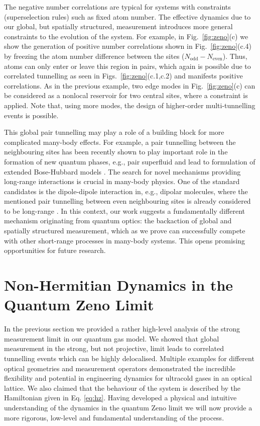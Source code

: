 The negative number correlations are typical for systems with
constraints (superselection rules) such as fixed atom number. The
effective dynamics due to our global, but spatially structured,
measurement introduces more general constraints to the evolution of
the system. For example, in Fig.~\ref{fig:zeno}(c) we show the
generation of positive number correlations shown in
Fig.~\ref{fig:zeno}(c.4) by freezing the atom number difference
between the sites ($N_\text{odd}-N_\text{even}$). Thus, atoms can only
enter or leave this region in pairs, which again is possible due to
correlated tunnelling as seen in Figs.~\ref{fig:zeno}(c.1,c.2) and
manifests positive correlations. As in the previous example, two edge
modes in Fig.~\ref{fig:zeno}(c) can be considered as a nonlocal
reservoir for two central sites, where a constraint is applied. Note
that, using more modes, the design of higher-order multi-tunnelling
events is possible.

This global pair tunnelling may play a role of a building block for
more complicated many-body effects. For example, a pair tunnelling
between the neighbouring sites has been recently shown to play
important role in the formation of new quantum phases, e.g., pair
superfluid \cite{sowinski2012} and lead to formulation of extended
Bose-Hubbard models \cite{omjyoti2015}. The search for novel
mechanisms providing long-range interactions is crucial in many-body
physics. One of the standard candidates is the dipole-dipole
interaction in, e.g., dipolar molecules, where the mentioned pair
tunnelling between even neighbouring sites is already considered to be
long-range \cite{sowinski2012,omjyoti2015}. In this context, our work
suggests a fundamentally different mechanism originating from quantum
optics: the backaction of global and spatially structured measurement,
which as we prove can successfully compete with other short-range
processes in many-body systems. This opens promising opportunities for
future research.

\section{Non-Hermitian Dynamics in the Quantum Zeno Limit}

In the previous section we provided a rather high-level analysis of
the strong measurement limit in our quantum gas model. We showed that
global measurement in the strong, but not projective, limit leads to
correlated tunnelling events which can be highly delocalised. Multiple
examples for different optical geometries and measurement operators
demonstrated the incredible flexibility and potential in engineering
dynamics for ultracold gases in an optical lattice. We also claimed
that the behaviour of the system is described by the Hamiltonian given
in Eq. \eqref{eq:hz}. Having developed a physical and intuitive
understanding of the dynamics in the quantum Zeno limit we will now
provide a more rigorous, low-level and fundamental understanding of
the process.

